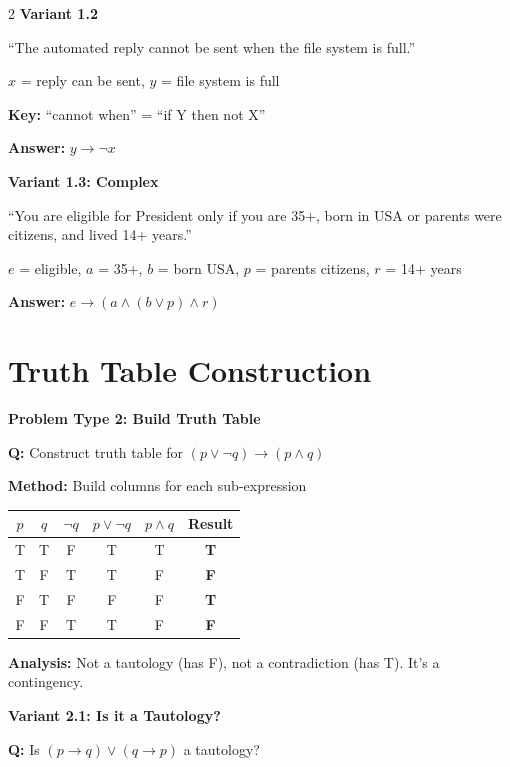 \documentclass[8pt,a4paper]{article}
\newenvironment{exbox}[1][]{\vspace{2pt}\noindent\textbf{#1}\par\smallskip}{\vspace{2pt}}
\begin{document}
\begin{multicols}{2}
\begin{exbox}[Variant 1.2]
``The automated reply cannot be sent when the file system is full.''

$x$ = reply can be sent, $y$ = file system is full

\textbf{Key:} ``cannot when'' = ``if Y then not X''

\textbf{Answer:} $y \to \neg x$
\end{exbox}

\begin{exbox}[Variant 1.3: Complex]
``You are eligible for President only if you are 35+, born in USA or parents were citizens, and lived 14+ years.''

$e$ = eligible, $a$ = 35+, $b$ = born USA, $p$ = parents citizens, $r$ = 14+ years

\textbf{Answer:} $e \to (a \land (b \lor p) \land r)$
\end{exbox}

\section{Truth Table Construction}

\begin{exbox}[Problem Type 2: Build Truth Table]
\textbf{Q:} Construct truth table for $(p \lor \neg q) \to (p \land q)$

\textbf{Method:} Build columns for each sub-expression

\begin{center}
\scriptsize
\begin{tabular}{cc|c|c|c|c}
$p$ & $q$ & $\neg q$ & $p \lor \neg q$ & $p \land q$ & Result \\
\hline
T & T & F & T & T & \textbf{T} \\
T & F & T & T & F & \textbf{F} \\
F & T & F & F & F & \textbf{T} \\
F & F & T & T & F & \textbf{F} \\
\end{tabular}
\end{center}

\textbf{Analysis:} Not a tautology (has F), not a contradiction (has T). It's a contingency.
\end{exbox}

\begin{exbox}[Variant 2.1: Is it a Tautology?]
\textbf{Q:} Is $(p \to q) \lor (q \to p)$ a tautology?


\end{exbox}
\end{multicols}
\end{document}
